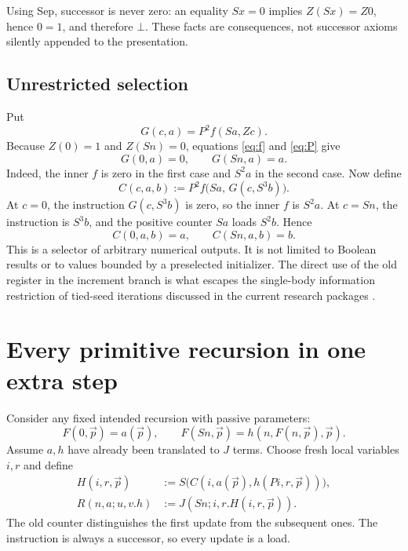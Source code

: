 \documentclass[11pt,letterpaper]{article}
\theoremstyle{definition}\newtheorem{definition}[theorem]{Definition}
\theoremstyle{remark}\newtheorem{remark}[theorem]{Remark}
\begin{document}
Using Sep, successor is never zero: an equality $Sx=0$ implies
$Z(Sx)=Z0$, hence $0=1$, and therefore $\bot$.
These facts are consequences, not successor axioms silently appended
to the presentation.

\subsection{Unrestricted selection}

Put
\[
 G(c,a)=P^2 f(Sa,Zc).
\]
Because $Z(0)=1$ and $Z(Sn)=0$, equations \eqref{eq:f}
and \eqref{eq:P} give
\begin{equation}
 G(0,a)=0,\qquad G(Sn,a)=a.\label{eq:G}
\end{equation}
Indeed, the inner $f$ is zero in the first case and $S^2a$ in the
second case. Now define
\begin{equation}
 C(c,a,b):=P^2 f\bigl(Sa,\,G(c,S^3b)\bigr).
 \label{def:C}
\end{equation}
At $c=0$, the instruction $G(c,S^3b)$ is zero, so the inner $f$
is $S^2a$. At $c=Sn$, the instruction is $S^3b$, and the
positive counter $Sa$ loads $S^2b$. Hence
\begin{equation}
 \boxed{\ C(0,a,b)=a,\qquad C(Sn,a,b)=b.\ }\label{eq:C}
\end{equation}
This is a selector of arbitrary numerical outputs. It is not limited
to Boolean results or to values bounded by a preselected initializer.
The direct use of the old register in the increment branch is what
escapes the single-body information restriction of tied-seed
iterations discussed in the current research packages \cite{barrier}.

\section{Every primitive recursion in one extra step}\label{sec:compiler}

Consider any fixed intended recursion with passive parameters:
\[
 F(0,\vec p)=a(\vec p),\qquad
 F(Sn,\vec p)=h(n,F(n,\vec p),\vec p).
\]
Assume $a,h$ have already been translated to $J$ terms. Choose fresh
local variables $i,r$ and define
\begin{align}
 H(i,r,\vec p)&:=S\bigl(C(i,a(\vec p),h(Pi,r,\vec p))\bigr),\label{def:H}\\
 R(n,a;u,v.h)&:=J(Sn;i,r.H(i,r,\vec p)).\label{def:R}
\end{align}
The old counter distinguishes the first update from the subsequent ones.
The instruction is always a successor, so every update is a load.
\end{document}
